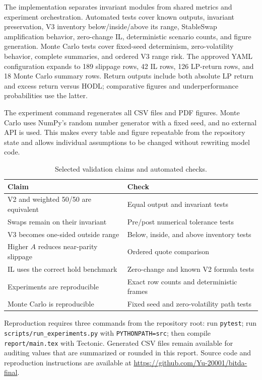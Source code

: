\documentclass[11pt,twocolumn]{article}
\begin{document}
The implementation separates invariant modules from shared metrics and
experiment orchestration. Automated tests cover known outputs, invariant
preservation, V3 inventory below/inside/above its range, StableSwap
amplification behavior, zero-change IL, deterministic scenario counts, and
figure generation. Monte Carlo tests cover fixed-seed determinism,
zero-volatility behavior, complete summaries, and ordered V3 range risk. The
approved YAML configuration expands to 189 slippage rows, 42 IL rows, 126
LP-return rows, and 18 Monte Carlo summary rows. Return outputs include both
absolute LP return and excess return versus HODL; comparative figures and
underperformance probabilities use the latter.

The experiment command regenerates all CSV files and PDF figures. Monte Carlo
uses NumPy's random number generator with a fixed seed, and no external API is
used. This makes every table and figure repeatable from the repository state
and allows individual assumptions to be changed without rewriting model code.

\begin{table}[!tbp]
\centering
\caption{Selected validation claims and automated checks.}
\small
\begin{tabular}{p{}p{}}
\toprule
Claim & Check\\
\midrule
V2 and weighted 50/50 are equivalent & Equal output and invariant tests\\
Swaps remain on their invariant & Pre/post numerical tolerance tests\\
V3 becomes one-sided outside range & Below, inside, and above inventory tests\\
Higher $A$ reduces near-parity slippage & Ordered quote comparison\\
IL uses the correct hold benchmark & Zero-change and known V2 formula tests\\
Experiments are reproducible & Exact row counts and deterministic frames\\
Monte Carlo is reproducible & Fixed seed and zero-volatility path tests\\
\bottomrule
\end{tabular}
\end{table}

Reproduction requires three commands from the repository root: run
\texttt{pytest}; run \texttt{scripts/run\_experiments.py} with
\texttt{PYTHONPATH=src}; then compile \texttt{report/main.tex} with Tectonic.
Generated CSV files remain available for auditing values that are summarized
or rounded in this report. Source code and reproduction instructions are
available at \url{https://github.com/Yu-20001/bitda-final}.
\end{document}
